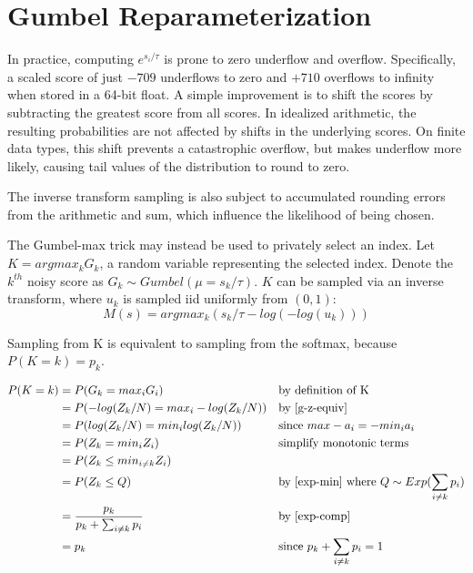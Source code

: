 \documentclass{article}
\begin{document}
\section{Gumbel Reparameterization}
\label{gumbel-reparam}

In practice, computing $e^{s_i / \tau}$ is prone to zero underflow and overflow. 
Specifically, a scaled score of just $-709$ underflows to zero and $+710$ overflows to infinity when stored in a 64-bit float. 
A simple improvement is to shift the scores by subtracting the greatest score from all scores.
In idealized arithmetic, the resulting probabilities are not affected by shifts in the underlying scores.
On finite data types, this shift prevents a catastrophic overflow, but makes underflow more likely, 
causing tail values of the distribution to round to zero. 

The inverse transform sampling is also subject to accumulated rounding errors from the arithmetic and sum, 
which influence the likelihood of being chosen.

The Gumbel-max trick may instead be used to privately select an index.
Let $K = argmax_k G_k$, a random variable representing the selected index. 
Denote the $k^{th}$ noisy score as $G_k \sim Gumbel(\mu = s_k / \tau)$.
$K$ can be sampled via an inverse transform, where $u_k$ is sampled iid uniformly from $(0, 1)$:
\begin{equation}
    M(s) = argmax_k (s_k / \tau - log(-log(u_k)))
\end{equation}

\begin{theorem}
    \label{gumbel-equiv}
Sampling from K is equivalent to sampling from the softmax, because $P(K=k) = p_k$. \cite{Medina2020DuffAD}
\end{theorem}
\begin{align*}
    P(K = k) &= P(G_k = max_i G_i) &&\text{by definition of K} \\
    &= P(-log(Z_k / N) = max_i -log(Z_k / N)) &&\text{by \ref{g-z-equiv}}\\
    &= P(log(Z_k / N) = min_i log(Z_k / N)) &&\text{since } max -a_i = -min_i a_i \\
    &= P(Z_k = min_i Z_i) &&\text{simplify monotonic terms} \\
    &= P(Z_k \leq min_{i \neq k} Z_i) \\
    &= P(Z_k \leq Q) &&\text{by \ref{exp-min} where } Q \sim Exp(\sum_{i \neq k} p_i)\\
    &= \frac{p_k}{p_k + \sum_{i \neq k} p_i}  &&\text{by \ref{exp-comp}} \\
    &= p_k &&\text{since } p_k + \sum_{i \neq k} p_i = 1
\end{align*}
\end{document}
